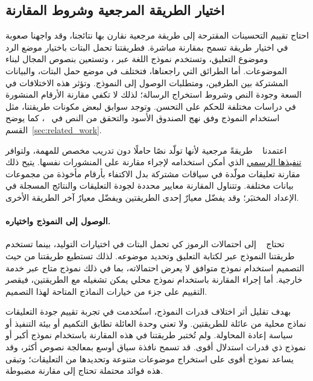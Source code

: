 \FloatBarrier

\FloatBarrier
\subsection{اختيار الطريقة المرجعية وشروط المقارنة}
\label{sec:baseline-choice}

احتاج تقييم التحسينات المقترحة إلى طريقة مرجعية نقارن بها نتائجنا، وقد واجهنا صعوبة في اختيار طريقة تسمح بمقارنة مباشرة. فطريقتنا تحمل البتات باختيار موضع الرد وموضوع التعليق، وتستخدم نموذج اللغة عبر ، وتستعين بنصوص المجال لبناء الموضوعات. أما الطرائق التي راجعناها، فتختلف في موضع حمل البتات، والبيانات المشتركة بين الطرفين، ومتطلبات الوصول إلى النموذج. وتؤثر هذه الاختلافات في السعة وجودة النص وشروط استخراج الرسالة؛ لذلك لا تكفي مقارنة الأرقام المنشورة في دراسات مختلفة للحكم على التحسن. وتوجد سوابق لبعض مكونات طريقتنا، مثل استخدام النموذج وفق نهج الصندوق الأسود والتحقق من النص في ~\cite{wu2024generative}، كما يوضح القسم~\ref{sec:related_work}.

اعتمدنا ~\cite{lin2024zero} طريقةً مرجعية لأنها تولّد نصًا حاملًا دون تدريب مخصص للمهمة، ولتوافر \href{https://github.com/leonardodalinky/zero-shot-GLS}{تنفيذها الرسمي} الذي أمكن استخدامه لإجراء مقارنة على المنشورات نفسها. يتيح ذلك مقارنة تعليقات مولّدة في سياقات مشتركة بدل الاكتفاء بأرقام مأخوذة من مجموعات بيانات مختلفة. وتتناول المقارنة معايير محددة لجودة التعليقات والنتائج المسجلة في الإعداد المختبَر؛ وقد يفضّل معيارٌ إحدى الطريقتين ويفضّل معيارٌ آخر الطريقة الأخرى.

\paragraph{الوصول إلى النموذج واختياره.}
\label{par:baseline-model-access}
تحتاج ~\cite{lin2024zero} إلى احتمالات الرموز كي تحمل البتات في اختيارات التوليد، بينما تستخدم طريقتنا النموذج عبر  لكتابة التعليق وتحديد موضوعه. لذلك تستطيع طريقتنا من حيث التصميم استخدام نموذج متوافق لا يعرض احتمالاته، بما في ذلك نموذج متاح عبر خدمة خارجية. أما إجراء المقارنة باستخدام نموذج محلي يمكن تشغيله مع الطريقتين، فيقصر التقييم على جزء من خيارات النماذج المتاحة لهذا التصميم.

\begin{samepage}
\label{par:baseline-model-scale}
بهدف تقليل أثر اختلاف قدرات النموذج، استُخدمت في تجربة تقييم جودة التعليقات نماذج محلية من عائلة  للطريقتين. ولا تعني وحدة العائلة تطابق التكميم أو بيئة التنفيذ أو سياسة إعادة المحاولة. ولم تُختبر طريقتنا في هذه المقارنة باستخدام نموذج أكبر أو نموذج ذي قدرات استدلال أقوى. قد تسمح نافذة سياق أوسع بمعالجة نصوص أكثر، وقد يساعد نموذج أقوى على استخراج موضوعات متنوعة وتحديدها من التعليقات؛ وتبقى هذه فوائد محتملة تحتاج إلى مقارنة مضبوطة.

\end{samepage}

